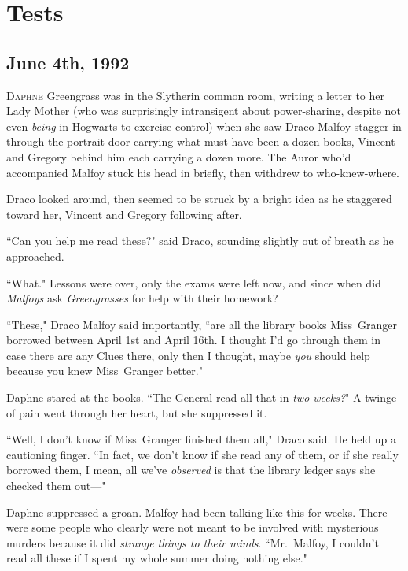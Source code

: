\chapter{Tests}

\section{June 4th, 1992}

\lettrine{D}{aphne} Greengrass was in the Slytherin common room, writing a letter to her Lady Mother (who was surprisingly intransigent about power-sharing, despite not even \emph{being} in Hogwarts to exercise control) when she saw Draco Malfoy stagger in through the portrait door carrying what must have been a dozen books, Vincent and Gregory behind him each carrying a dozen more. The Auror who'd accompanied Malfoy stuck his head in briefly, then withdrew to who-knew-where.

Draco looked around, then seemed to be struck by a bright idea as he staggered toward her, Vincent and Gregory following after.

``Can you help me read these?" said Draco, sounding slightly out of breath as he approached.

``What." Lessons were over, only the exams were left now, and since when did \emph{Malfoys} ask \emph{Greengrasses} for help with their homework?

``These," Draco Malfoy said importantly, ``are all the library books Miss~Granger borrowed between April 1st and April 16th. I thought I'd go through them in case there are any Clues there, only then I thought, maybe \emph{you} should help because you knew Miss~Granger better."

Daphne stared at the books. ``The General read all that in \emph{two weeks?}" A twinge of pain went through her heart, but she suppressed it.

``Well, I don't know if Miss~Granger finished them all," Draco said. He held up a cautioning finger. ``In fact, we don't know if she read any of them, or if she really borrowed them, I mean, all we've \emph{observed} is that the library ledger says she checked them out---"

Daphne suppressed a groan. Malfoy had been talking like this for weeks. There were some people who clearly were not meant to be involved with mysterious murders because it did \emph{strange things to their minds}. ``Mr.~Malfoy, I couldn't read all these if I spent my whole summer doing nothing else."

